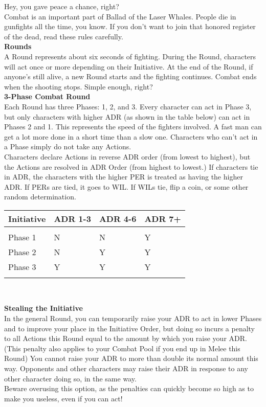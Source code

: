 \documentclass[a4paper, twocolumn, openany]{book}
\begin{document}
{Hey, you gave peace a chance, right?\\

Combat is an important part of Ballad of the Laser Whales. People die in gunfights all the time,
you know. If you don’t want to join that honored register of the dead, read these rules carefully.\\

{\bfseries Rounds\\}
A Round represents about six seconds of fighting. During the Round, characters will act once or
more depending on their Initiative. At the end of the Round, if anyone’s still alive, a new Round
starts and the fighting continues. Combat ends when the shooting stops. Simple enough, right?\\

{\bfseries 3-Phase Combat Round\\}
Each Round has three Phases: 1, 2, and 3. Every character can act in Phase 3, but only
characters with higher ADR (as shown in the table below) can act in Phases 2 and 1. This
represents the speed of the fighters involved. A fast man can get a lot more done in a short time
than a slow one. Characters who can’t act in a Phase simply do not take any Actions.\\

Characters declare Actions in reverse ADR order (from lowest to highest), but the Actions are
resolved in ADR Order (from highest to lowest.) If characters tie in ADR, the characters with the
higher PER is treated as having the higher ADR. If PERs are tied, it goes to WIL. If WILs tie, flip
a coin, or some other random determination.\\

{\centering
\noindent\begin{tabular}{llll}
	Initiative & ADR 1-3 & ADR 4-6 & ADR 7+\\ \hline \\
	Phase 1 & N & N & Y \\
	Phase 2 & N & Y & Y \\
	Phase 3 & Y & Y & Y \\
	\\ \hline
\end{tabular}\\ }\vspace*{\baselineskip} %

{\bfseries Stealing the Initiative\\}
In the general Round, you can temporarily raise your ADR to act in lower Phases and to
improve your place in the Initiative Order, but doing so incurs a penalty to all Actions this Round
equal to the amount by which you raise your ADR. (This penalty also applies to your Combat
Pool if you end up in Melee this Round) You cannot raise your ADR to more than double its
normal amount this way. Opponents and other characters may raise their ADR in response to
any other character doing so, in the same way.\\
Beware overusing this option, as the penalties can quickly become so high as to make you
useless, even if you can act!\\

}
\end{document}
